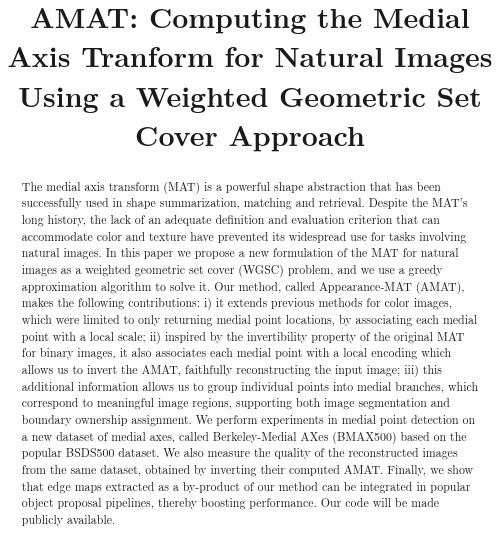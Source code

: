 \documentclass[10pt,twocolumn,letterpaper]{article}
\begin{document}
\title{AMAT: Computing the Medial Axis Tranform for Natural Images Using a Weighted Geometric Set Cover Approach}
\maketitle


\begin{abstract}
The medial axis transform (MAT) is a powerful shape abstraction that has been successfully
used in shape summarization, matching and retrieval. Despite the MAT's
long history, the lack of an adequate definition and evaluation criterion that can accommodate
color and texture have prevented its widespread use for tasks involving natural images.
In this paper we propose a new formulation of the
MAT for natural images as a weighted geometric set cover (WGSC) problem, and we use a greedy 
approximation algorithm to solve it.
Our method, called Appearance-MAT (AMAT), makes the following contributions: 
i) it extends previous methods for color images, which were limited to only returning medial point locations, 
by associating  each medial point with a local scale; 
ii) inspired by the invertibility property of the 
original MAT for binary images, it also associates each medial point with a local encoding
which allows us to invert the AMAT, faithfully reconstructing the input image; 
iii) this additional information allows us to group individual points into medial branches,
which correspond to meaningful image regions, supporting both image segmentation and boundary
ownership assignment.
We perform experiments in medial point detection on a new dataset of medial axes, called
Berkeley-Medial AXes (BMAX500) based on the popular BSDS500 dataset.
We also measure the quality of the reconstructed images from the same dataset,
obtained by inverting their computed AMAT. 
Finally, we show that edge maps extracted as a by-product of our method
can be integrated in popular object proposal pipelines, thereby boosting performance.
Our code will be made publicly available. 
\end{abstract}



\end{document}
